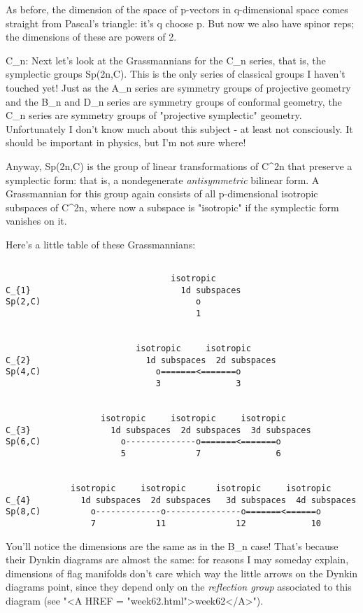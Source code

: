As before, the dimension of the space of p-vectors in q-dimensional
space comes straight from Pascal's triangle: it's q choose p.  But now
we also have spinor reps; the dimensions of these are powers of 2.

C_{n}: Next let's look at the Grassmannians for the
C_{n} series, that is, the symplectic groups Sp(2n,C).  This is
the only series of classical groups I haven't touched yet!  Just as the
A_{n} series are symmetry groups of projective geometry and the
B_{n} and D_{n} series are symmetry groups of conformal
geometry, the C_{n} series are symmetry groups of
"projective symplectic" geometry.  Unfortunately I don't know
much about this subject - at least not consciously.  It should be
important in physics, but I'm not sure where!

Anyway, Sp(2n,C) is the group of linear transformations of C^{2n} that
preserve a symplectic form: that is, a nondegenerate \emph{antisymmetric}
bilinear form.  A Grassmannian for this group again consists of all
p-dimensional isotropic subspaces of C^{2n}, where now a subspace is
"isotropic" if the symplectic form vanishes on it.

Here's a little table of these Grassmannians:



\begin{verbatim}

                                 isotropic 
C_{1}                              1d subspaces
Sp(2,C)                               o
                                      1

     
                          isotropic     isotropic          
C_{2}                       1d subspaces  2d subspaces
Sp(4,C)                       o=======<=======o
                              3               3


                   isotropic     isotropic     isotropic
C_{3}                1d subspaces  2d subspaces  3d subspaces
Sp(6,C)                o--------------o=======<=======o
                       5              7               6


             isotropic     isotropic      isotropic     isotropic
C_{4}          1d subspaces  2d subspaces   3d subspaces  4d subspaces
Sp(8,C)          o-------------o---------------o=======<======o
                 7            11              12             10 
\end{verbatim}
    

You'll notice the dimensions are the same as in the B_{n} case!  That's
because their Dynkin diagrams are almost the same: for reasons I may
someday explain, dimensions of flag manifolds don't care which way the
little arrows on the Dynkin diagrams point, since they depend only on
the \emph{reflection group} associated to this diagram (see "<A HREF = "week62.html">week62</A>").  


